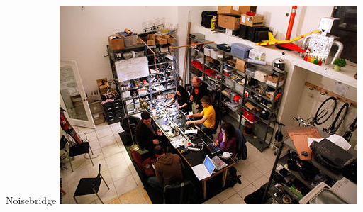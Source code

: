 \documentclass{beamer}
\begin{document}
  \begin{frame}{Noisebridge}
    \includegraphics{noisebridge.jpg}
  \end{frame}
\end{document}
